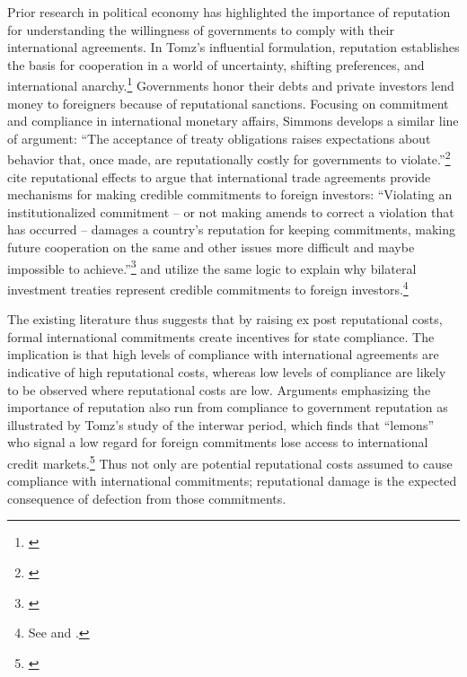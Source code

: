 \documentclass[12pt,onesided]{amsart}
\begin{document}
Prior research in political economy has highlighted the importance of reputation for understanding the willingness of governments to comply with their international agreements. In Tomz's influential formulation, reputation establishes the basis for cooperation in a world of uncertainty, shifting preferences, and international anarchy.\footnote{\citet{tomz:2007}} Governments honor their debts and private investors lend money to foreigners because of reputational sanctions. Focusing on commitment and compliance in international monetary affairs, Simmons develops a similar line of argument: ``The acceptance of treaty obligations raises expectations about behavior that, once made, are reputationally costly for governments to violate.''\footnote{\citet[p. 819]{simmons:2000}} \citeauthor{buthe:milner:2008} cite reputational effects to argue that international trade agreements provide mechanisms for making credible commitments to foreign investors: ``Violating an institutionalized commitment -- or not making amends to correct a violation that has occurred -- damages a country's reputation for keeping commitments, making future cooperation on the same and other issues more difficult and maybe impossible to achieve.''\footnote{\citet[p. 746]{buthe:milner:2008}}  \citeauthor{buthe:milner:2009} and \citeauthor{elkins:etal:2006} utilize the same logic to explain why bilateral investment treaties represent credible commitments to foreign investors.\footnote{See \citet{buthe:milner:2009} and \citet{elkins:etal:2006}.}

The existing literature thus suggests that by raising ex post reputational costs, formal international commitments create incentives for state compliance. The implication is that high levels of compliance with international agreements are indicative of high reputational costs, whereas low levels of compliance are likely to be observed where reputational costs are low. Arguments emphasizing the importance of reputation also run from compliance to government reputation as illustrated by Tomz's study of the interwar period, which finds that ``lemons'' who signal a low regard for foreign commitments lose access to international credit markets.\footnote{\citet[p. 86--94]{tomz:2007}} Thus not only are potential reputational costs assumed to cause compliance with international commitments; reputational damage is the expected consequence of defection from those commitments. 
\end{document}
